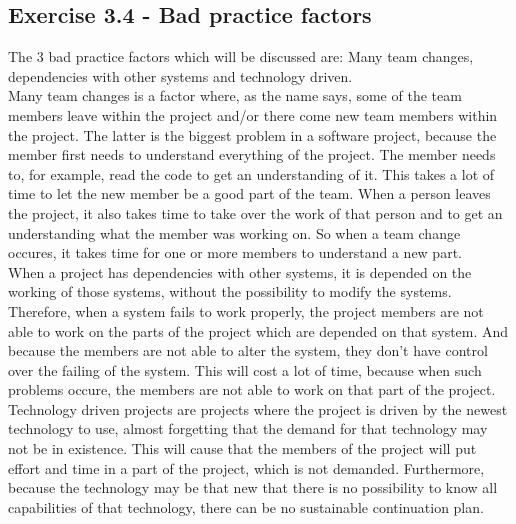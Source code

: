 \documentclass[10pt]{article}
\begin{document}
\subsection{Exercise 3.4 - Bad practice factors}
The 3 bad practice factors which will be discussed are: Many team changes, dependencies with other systems and technology driven.\\
Many team changes is a factor where, as the name says, some of the team members leave within the project and/or there come new team members within the project. The latter is the biggest problem in a software project, because the member first needs to understand everything of the project. The member needs to, for example, read the code to get an understanding of it. This takes a lot of time to let the new member be a good part of the team. When a person leaves the project, it also takes time to take over the work of that person and to get an understanding what the member was working on. So when a team change occures, it takes time for one or more members to understand a new part.\\
When a project has dependencies with other systems, it is depended on the working of those systems, without the possibility to modify the systems. Therefore, when a system fails to work properly, the project members are not able to work on the parts of the project which are depended on that system. And because the members are not able to alter the system, they don't have control over the failing of the system. This will cost a lot of time, because when such problems occure, the members are not able to work on that part of the project.\\
Technology driven projects are projects where the project is driven by the newest technology to use, almost forgetting that the demand for that technology may not be in existence. This will cause that the members of the project will put effort and time in a part of the project, which is not demanded. Furthermore, because the technology may be that new that there is no possibility to know all capabilities of that technology, there can be no sustainable continuation plan. 
\end{document}
